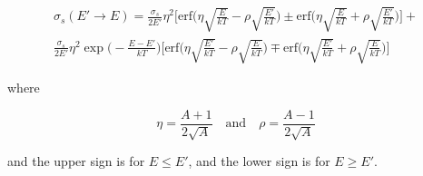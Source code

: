 \begin{equation}
\begin{aligned}
\sigma_s(E'\rightarrow E)=\frac{\sigma_s}{2E'}\eta^2\Bigg[\text{erf}\Bigg(\eta\sqrt{\frac{E}{kT}}-\rho\sqrt{\frac{E'}{kT}}\Bigg)\pm \text{erf}\Bigg(\eta\sqrt{\frac{E}{kT}}+\rho\sqrt{\frac{E'}{kT}}\Bigg)\Bigg]+ \\ \frac{\sigma_s}{2E'}\eta^2\exp\Bigg(-\frac{E-E'}{kT}\Bigg)\Bigg[\text{erf}\Bigg(\eta\sqrt{\frac{E'}{kT}}-\rho\sqrt{\frac{E}{kT}}\Bigg)\mp \text{erf}\Bigg(\eta\sqrt{\frac{E'}{kT}}+\rho\sqrt{\frac{E}{kT}}\Bigg)\Bigg]
\end{aligned}
\end{equation}

\noindent where

\[
\eta=\frac{A+1}{2\sqrt{A}} \quad \text{and} \quad \rho=\frac{A-1}{2\sqrt{A}}
\]

\noindent and the upper sign is for $E\leq E'$, and the lower sign is for $E\geq E'$.

